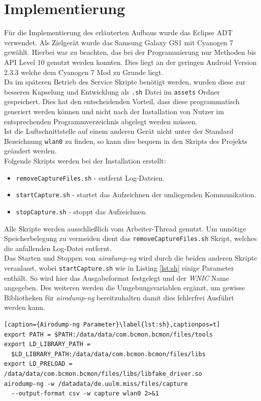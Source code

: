 \documentclass[]{report}
\begin{document}
\section{Implementierung}
Für die Implementierung des erläuterten Aufbaus wurde das Eclipse ADT \cite{ADT} verwendet. Als Zielgerät wurde das Samsung Galaxy GS1 \cite{S1} mit Cyanogen 7 gewählt. Hierbei war zu beachten, das bei der Programmierung nur Methoden bis API Level 10 genutzt werden konnten. Dies liegt an der geringen Android Version 2.3.3 welche dem Cyanogen 7 Mod zu Grunde liegt. \\
Da im späteren Betrieb des Service Skripte benötigt werden, wurden diese zur besseren Kapselung und Entwicklung als \texttt{.sh} Datei im \texttt{assets} Ordner gespeichert. Dies hat den entscheidenden Vorteil, dass diese programmatisch generiert werden können und nicht nach der Installation von Nutzer im entsprechenden Programmverzeichnis abgelegt werden müssen.\\ Ist die Luftschnittstelle auf einem anderen Gerät nicht unter der Standard Bezeichnung \texttt{wlan0} zu finden, so kann dies bequem in den Skripts des Projekts geändert werden. \\ 
Folgende Skripts werden bei der Installation erstellt:
\begin{itemize}
\item \texttt{removeCaptureFiles.sh} - entfernt Log-Dateien.
\item \texttt{startCapture.sh} - startet das Aufzeichnen der umliegenden Kommunikation.
\item \texttt{stopCapture.sh} - stoppt das Aufzeichnen.
\end{itemize}
Alle Skripte werden ausschließlich vom Arbeiter-Thread genutzt. Um unnötige Speicherbelegung zu vermeiden dient das \texttt{removeCaptureFiles.sh} Skript, welches die anfallenden Log-Datei entfernt. \\ Das Starten und Stoppen von \textit{airodump-ng} wird durch die beiden anderen Skripte veranlasst, wobei \texttt{startCapture.sh} wie in Listing \ref{lst:sh} einige Parameter enthält. So wird hier das Ausgabeformat festgelegt und der \textit{WNIC} Name angegeben. Des weiteren werden die Umgebungsvariablen ergänzt, um gewisse Bibliotheken für \textit{airodump-ng} bereitzuhalten damit dies fehlerfrei Ausführt werden kann.
\begin{lstlisting}[caption={Airodump-ng Parameter}\label{lst:sh},captionpos=t] 
export PATH = $PATH:/data/data/com.bcmon.bcmon/files/tools
export LD_LIBRARY_PATH = 
  $LD_LIBRARY_PATH:/data/data/com.bcmon.bcmon/files/libs
export LD_PRELOAD = /data/data/com.bcmon.bcmon/files/libs/libfake_driver.so
airodump-ng -w /datadata/de.uulm.miss/files/capture 
  --output-format csv -w capture wlan0 2>&1
 \end{lstlisting}
\end{document}
